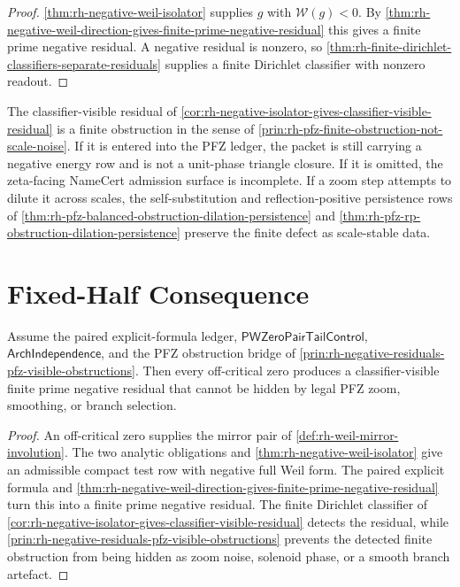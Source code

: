 \begin{proof}
\autoref{thm:rh-negative-weil-isolator} supplies $g$ with
$\mathcal W(g)<0$.  By
\autoref{thm:rh-negative-weil-direction-gives-finite-prime-negative-residual}
this gives a finite prime negative residual.  A negative residual is
nonzero, so
\autoref{thm:rh-finite-dirichlet-classifiers-separate-residuals} supplies
a finite Dirichlet classifier with nonzero readout.
\end{proof}

\begin{principle}
\label{prin:rh-negative-residuals-pfz-visible-obstructions}
The classifier-visible residual of
\autoref{cor:rh-negative-isolator-gives-classifier-visible-residual} is
a finite obstruction in the sense of
\autoref{prin:rh-pfz-finite-obstruction-not-scale-noise}.  If it is
entered into the PFZ ledger, the packet is still carrying a negative
energy row and is not a unit-phase triangle closure.  If it is omitted,
the zeta-facing NameCert admission surface is incomplete.  If a zoom
step attempts to dilute it across scales, the self-substitution and
reflection-positive persistence rows of
\autoref{thm:rh-pfz-balanced-obstruction-dilation-persistence} and
\autoref{thm:rh-pfz-rp-obstruction-dilation-persistence} preserve the
finite defect as scale-stable data.
\end{principle}

\section{Fixed-Half Consequence}
\label{sec:rh-negative-weil-fixed-half-consequence}

\begin{theorem}
\label{thm:rh-offcritical-zero-gives-unhideable-negative-residual}
Assume the paired explicit-formula ledger,
$\mathsf{PWZeroPairTailControl}$,
$\mathsf{ArchIndependence}$, and the PFZ obstruction bridge of
\autoref{prin:rh-negative-residuals-pfz-visible-obstructions}.  Then
every off-critical zero produces a classifier-visible finite prime
negative residual that cannot be hidden by legal PFZ zoom, smoothing, or
branch selection.
\end{theorem}

\begin{proof}
An off-critical zero supplies the mirror pair of
\autoref{def:rh-weil-mirror-involution}.  The two analytic obligations
and \autoref{thm:rh-negative-weil-isolator} give an admissible compact
test row with negative full Weil form.  The paired explicit formula and
\autoref{thm:rh-negative-weil-direction-gives-finite-prime-negative-residual}
turn this into a finite prime negative residual.  The finite Dirichlet
classifier of
\autoref{cor:rh-negative-isolator-gives-classifier-visible-residual}
detects the residual, while
\autoref{prin:rh-negative-residuals-pfz-visible-obstructions} prevents
the detected finite obstruction from being hidden as zoom noise,
solenoid phase, or a smooth branch artefact.
\end{proof}

